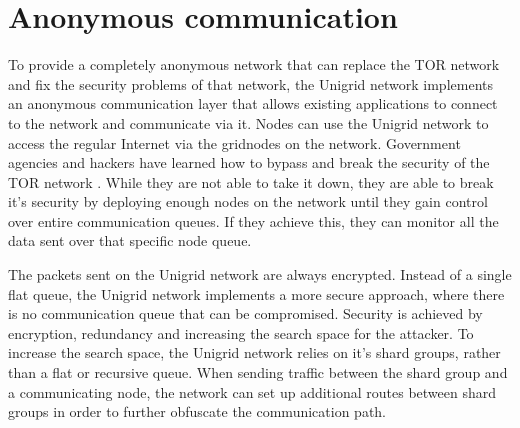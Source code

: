 \documentclass[10pt,a4paper,final]{article}
\begin{document}
\section{Anonymous communication}
To provide a completely anonymous network that can replace the TOR network and fix the security problems of that network, the Unigrid network implements an anonymous communication layer that allows existing applications to connect to the network and communicate via it. Nodes can use the Unigrid network to access the regular Internet via the \glspl{gridnode} on the network. Government agencies and hackers have learned how to bypass and break the security of the TOR network \cite{guardian2013}. While they are not able to take it down, they are able to break it's security by deploying enough nodes on the network until they gain control over entire communication queues. If they achieve this, they can monitor all the data sent over that specific node queue.

The packets sent on the Unigrid network are always encrypted. Instead of a single flat queue, the Unigrid network implements a more secure approach, where there is no communication queue that can be compromised. Security is achieved by encryption, redundancy and increasing the search space for the attacker. To increase the search space, the Unigrid network relies on it's shard groups, rather than a flat or recursive queue. When sending traffic between the shard group and a communicating node, the network can set up additional routes between shard groups in order to further obfuscate the communication path.
\end{document}
